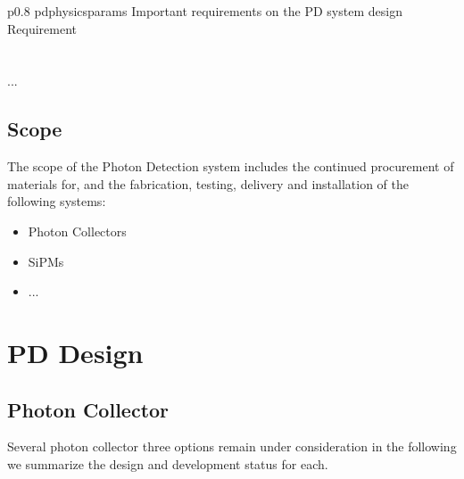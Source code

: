 \begin{dunetable}
{p{0.8\textwidth}}
{pdphysicsparams}
{Important requirements on the PD system design}   
Requirement  \\ \toprowrule
  \\ \colhline
   \\ \colhline
 ...\\ 
\end{dunetable}



\subsection{Scope}
\label{sec:fdsp-pd-scope}

The scope of the Photon Detection system includes the continued procurement of materials for, and the fabrication, testing, delivery and installation of the following systems: 


\begin{itemize}
\item Photon Collectors 
\item SiPMs
\item ...
\end{itemize}



\section{PD Design}
\label{sec:fdsp-pd-design}



\subsection{Photon Collector}
\label{sec:fdsp-pd-pc}

Several photon collector three options remain under consideration in the following we summarize the design and development status for each.

